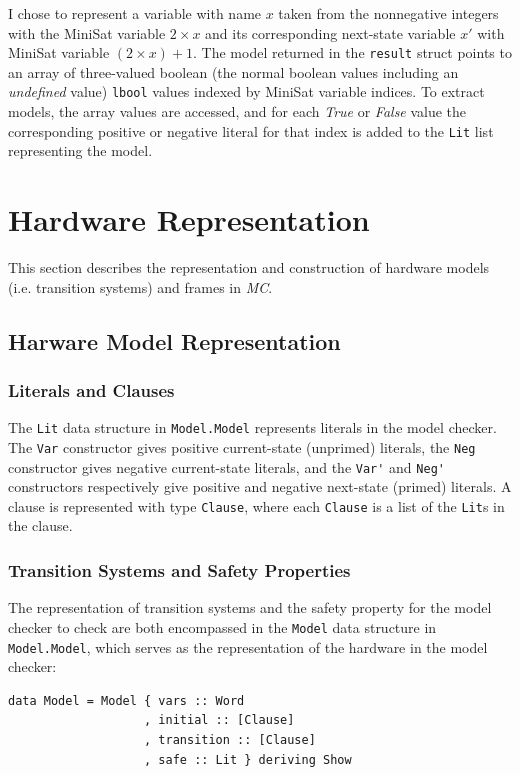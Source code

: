 \documentclass[12pt,a4paper,twoside,openright]{report}
\begin{document}
{I chose to represent a variable with name $x$ taken from the nonnegative integers with
the MiniSat variable $2 \times x$ and its corresponding next-state variable $x'$
with MiniSat variable $(2 \times x) + 1$. The model returned in the \verb,result, struct
points to an array of three-valued boolean (the normal boolean values including an
\emph{undefined} value) \verb,lbool, values indexed by MiniSat variable indices.
To extract models, the array values are accessed, and for each \emph{True} or \emph{False}
value the corresponding positive or negative literal for that index is added to the
\verb,Lit, list representing the model.

\section{Hardware Representation}
\label{impl:representation}
This section describes the representation and construction of hardware models (i.e.
transition systems) and frames in \emph{MC}.
\subsection{Harware Model Representation}
\subsubsection{Literals and Clauses}
The \verb,Lit, data structure in \verb,Model.Model, represents literals in
the model checker.
The \verb,Var, constructor gives positive current-state (unprimed) literals, the \verb,Neg,
constructor gives negative current-state literals, and the \verb,Var', and \verb,Neg', constructors
respectively give positive and negative next-state (primed) literals.
A clause is represented with type \verb,Clause,, where each \verb,Clause, is a
list of the \verb,Lit,s in the clause.

\subsubsection{Transition Systems and Safety Properties}
The representation of transition systems and the safety property for the model checker to check
are both encompassed in the \verb,Model, data structure in \verb,Model.Model,, which serves
as the representation of the hardware in the model checker:
\begin{lstlisting}
data Model = Model { vars :: Word
                   , initial :: [Clause]
                   , transition :: [Clause]
                   , safe :: Lit } deriving Show
\end{lstlisting}

}
\end{document}
